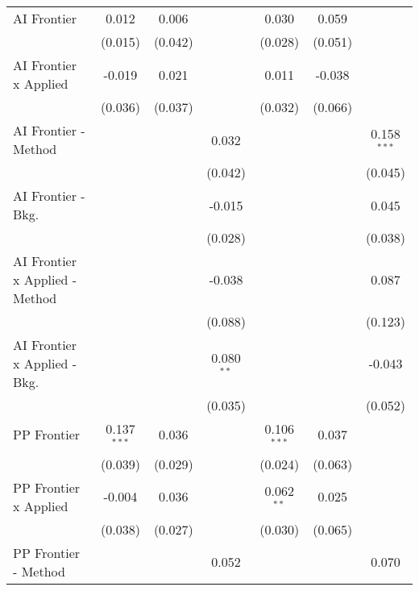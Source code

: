 \begin{tabular}{lcccccc}
   AI Frontier                    & 0.012         & 0.006        &               & 0.030         & 0.059   &   \\   
                                  & (0.015)       & (0.042)      &               & (0.028)       & (0.051) &   \\   
   AI Frontier x Applied          & -0.019        & 0.021        &               & 0.011         & -0.038  &   \\   
                                  & (0.036)       & (0.037)      &               & (0.032)       & (0.066) &   \\   
   AI Frontier - Method           &               &              & 0.032         &               &         & 0.158$^{***}$\\   
                                  &               &              & (0.042)       &               &         & (0.045)\\   
   AI Frontier - Bkg.             &               &              & -0.015        &               &         & 0.045\\   
                                  &               &              & (0.028)       &               &         & (0.038)\\   
   AI Frontier x Applied - Method &               &              & -0.038        &               &         & 0.087\\   
                                  &               &              & (0.088)       &               &         & (0.123)\\   
   AI Frontier x Applied - Bkg.   &               &              & 0.080$^{**}$  &               &         & -0.043\\   
                                  &               &              & (0.035)       &               &         & (0.052)\\   
   PP Frontier                    & 0.137$^{***}$ & 0.036        &               & 0.106$^{***}$ & 0.037   &   \\   
                                  & (0.039)       & (0.029)      &               & (0.024)       & (0.063) &   \\   
   PP Frontier x Applied          & -0.004        & 0.036        &               & 0.062$^{**}$  & 0.025   &   \\   
                                  & (0.038)       & (0.027)      &               & (0.030)       & (0.065) &   \\   
   PP Frontier - Method           &               &              & 0.052         &               &         & 0.070\\   

\end{tabular}
